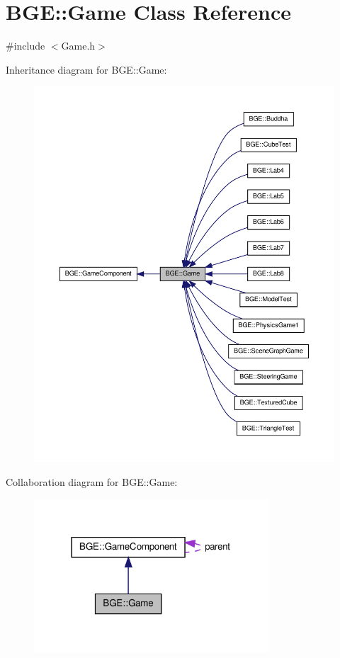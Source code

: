 \hypertarget{class_b_g_e_1_1_game}{\section{B\-G\-E\-:\-:Game Class Reference}
\label{class_b_g_e_1_1_game}
}


{\ttfamily \#include $<$Game.\-h$>$}



Inheritance diagram for B\-G\-E\-:\-:Game\-:
\nopagebreak
\begin{figure}[H]
\begin{center}
\leavevmode
\includegraphics[width=350pt]{class_b_g_e_1_1_game__inherit__graph}
\end{center}
\end{figure}


Collaboration diagram for B\-G\-E\-:\-:Game\-:
\nopagebreak
\begin{figure}[H]
\begin{center}
\leavevmode
\includegraphics[width=249pt]{class_b_g_e_1_1_game__coll__graph}
\end{center}
\end{figure}
